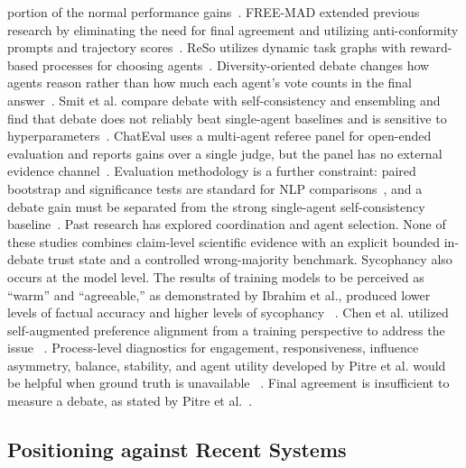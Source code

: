 portion of the normal performance gains~\cite{choi2025debate}. FREE-MAD
extended previous research by eliminating the need for final agreement and
utilizing anti-conformity prompts and trajectory scores~\cite{cui2026freemad}.
ReSo utilizes dynamic task graphs with reward-based processes for choosing
agents~\cite{zhou2025reso}.
Diversity-oriented debate changes how agents reason rather than how much each agent's vote counts in the final answer~\cite{liu2025breaking}. Smit et al. compare debate with self-consistency and ensembling and find that debate does not reliably beat single-agent baselines and is sensitive to hyperparameters~\cite{smit2024mad}. ChatEval uses a multi-agent referee panel for open-ended evaluation and reports gains over a single judge, but the panel has no external evidence channel~\cite{chan2024chateval}. Evaluation methodology is a further constraint: paired bootstrap and significance tests are standard for NLP comparisons~\cite{koehn2004statistical}, and a debate gain must be separated from the strong single-agent self-consistency baseline~\cite{wang2023selfconsistency}. Past research has explored coordination and agent selection. None of these studies combines claim-level scientific evidence with an explicit bounded in-debate trust state and a controlled wrong-majority benchmark.
Sycophancy also occurs at the model level. The results of training models to
be perceived as ``warm'' and ``agreeable,'' as demonstrated by Ibrahim et al.,
produced lower levels of factual accuracy and higher levels of sycophancy
~\cite{ibrahim2026training}. Chen et al. utilized self-augmented preference
alignment from a training perspective to address the issue
~\cite{chen2025self}.
Process-level diagnostics for engagement, responsiveness, influence
asymmetry, balance, stability, and agent utility developed by Pitre et al.
would be helpful when ground truth is unavailable
~\cite{pitre2026diagnostic}. Final agreement is insufficient to measure a
debate, as stated by Pitre et al.~\cite{pitre2026diagnostic}.


\subsection{Positioning against Recent Systems}\label{subsec:positioning}

